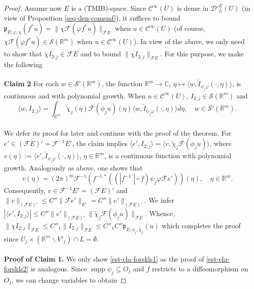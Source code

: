 \documentclass[12pt,reqno]{amsart}
\newcommand{\CC}{\mathbb C}
\newcommand{\RR}{\mathbb R}
\newcommand{\DD}{\mathcal D}
\newcommand{\SSS}{\mathcal S}
\newcommand{\supp}{\operatorname{supp}}
\theoremstyle{plain}
\theoremstyle{remark}
\theoremstyle{definition}
\numberwithin{equation}{section}
\begin{document}
\begin{proof}
\indent Assume now $E$ is a (TMIB)-space. Since $\mathcal{C}^{\infty}(U)$ is dense in $\DD'^E_L(U)$ (in view of Proposition \ref{seq-den-comsmf}), it suffices to bound $\mathfrak{p}_{E;\varphi,\chi}(f^*u)=\|\chi\mathcal{F}(\varphi f^*u)\|_{\mathcal{F}E}$ when $u\in\mathcal{C}^{\infty}(U)$ (of course, $\chi\mathcal{F}(\varphi f^*u)\in\SSS(\RR^m)$ when $u\in\mathcal{C}^{\infty}(U)$). In view of the above, we only need to show that $\chi I_{2;j}\in\mathcal{F}E$ and to bound $\|\chi I_{2;j}\|_{\mathcal{F}E}$. For this purpose, we make the following\\
\\
\noindent \textbf{Claim 2} For each $w\in\SSS'(\RR^m)$, the function $\RR^m\rightarrow \CC$, $\eta\mapsto \langle w, \widetilde{I}_{\psi_j\varphi}(\cdot,\eta)\rangle$, is continuous and with polynomial growth. When $u\in\mathcal{C}^{\infty}(U)$, $I_{2;j}\in\SSS(\RR^m)$ and
\begin{equation*}
\langle w,I_{2;j}\rangle=\int_{\RR^m}\widetilde{\chi}_j(\eta)\mathcal{F}(\phi_j u)(\eta)\langle w,\widetilde{I}_{\psi_j\varphi}(\cdot,\eta)\rangle d\eta,\quad w\in\SSS'(\RR^m).
\end{equation*}
\\
\indent We defer its proof for later and continue with the proof of the theorem. For $e'\in (\mathcal{F}E)'=\mathcal{F}^{-1}E'$, the claim implies $\langle e', I_{2;j}\rangle=\langle v,\widetilde{\chi}_j\mathcal{F}(\phi_j u)\rangle$, where $v(\eta):=\langle e',\widetilde{I}_{\psi_j\varphi}(\cdot,\eta)\rangle$, $\eta\in\RR^m$, is a continuous function with polynomial growth. Analogously as above, one shows that
\begin{equation*}
v(\eta)= (2\pi)^m\mathcal{F}^{-1}\left(f^{-1\,*}\left((|f^{-1\, '}|\circ f)\psi_j\varphi\mathcal{F}e'\right)\right)(\eta),\quad \eta\in\RR^m.
\end{equation*}
Consequently, $v\in\mathcal{F}^{-1}E'=(\mathcal{F}E)'$ and $\|v\|_{(\mathcal{F}E)'}\leq C''\|\mathcal{F}e'\|_{E'}=C''\|e'\|_{(\mathcal{F}E)'}$. We infer $|\langle e', I_{2;j}\rangle|\leq C''\|e'\|_{(\mathcal{F}E)'}\|\widetilde{\chi}_j\mathcal{F}(\phi_j u)\|_{\mathcal{F}E}$. Whence, $\|\chi I_{2;j}\|_{\mathcal{F}E}\leq C''_1\|I_{2;j}\|_{\mathcal{F}E}\leq C''_1C''\mathfrak{p}_{E;\phi_j,\widetilde{\chi}_j}(u)$ which completes the proof since $U_j\times(\RR^m\backslash V'_j)\cap L=\emptyset$.\\
\\
\noindent \textbf{Proof of Claim 1.} We only show \eqref{est-cla-forskls1} as the proof of \eqref{est-cla-forskls2} is analogous. Since $\supp\psi_j\subseteq O_j$ and $f$ restricts to a diffeomorphism on $O_j$, we can change variables to obtain

\end{proof}
\end{document}
